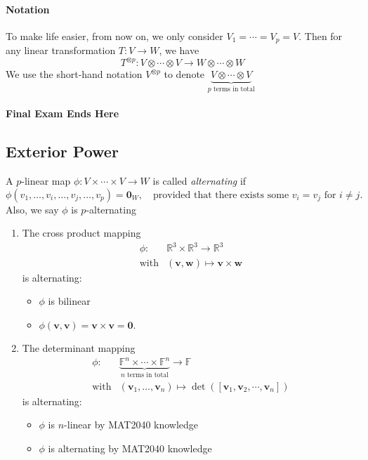 \paragraph{Notation}
To make life easier, from now on, we only consider $V_1=\cdots=V_p=V$.
Then for any linear transformation $T:V\to W$, we have
\[
T^{\otimes p}:V\otimes\cdots\otimes V\to W\otimes\cdots\otimes W
\]
We use the short-hand notation $V^{\otimes p}$ to denote $\underbrace{V\otimes\cdots\otimes V}_{\text{$p$ terms in total}}$

\paragraph{Final Exam Ends Here}

\subsection{Exterior Power}

\begin{definition}
A $p$-linear map $\phi:V\times\cdots\times V\to W$ is called \emph{alternating} if
\[
\phi(v_1,\dots,v_i,\dots,v_j,\dots,v_p)=\bm0_{W},\quad
\text{provided that there exists some $v_i=v_j$ for $i\ne j$}.
\]
Also, we say $\phi$ is $p$-alternating
\end{definition}
\begin{example}
\begin{enumerate}
\item
The cross product mapping
\[
\begin{array}{ll}
\phi:&\mathbb{R}^3\times\mathbb{R}^3\to\mathbb{R}^3\\
\text{with}&(\bm v,\bm w)\mapsto\bm v\times\bm w
\end{array}
\]
is alternating:
\begin{itemize}
\item
$\phi$ is bilinear
\item
$\phi(\bm v,\bm v)=\bm v\times\bm v=\bm0$.
\end{itemize}
\item
The determinant mapping
\[
\begin{array}{ll}
\phi:&\underbrace{\mathbb{F}^n\times\cdots\times\mathbb{F}^n}_{\text{$n$ terms in total}}\to\mathbb{F}\\
\text{with}&(\bm v_1,\dots,\bm v_n)\mapsto\det([\bm v_1,\bm v_2,\cdots,\bm v_n])
\end{array}
\]
is alternating:
\begin{itemize}
\item
$\phi$ is $n$-linear by MAT2040 knowledge
\item
$\phi$ is alternating by MAT2040 knowledge
\end{itemize}
\end{enumerate}
\end{example}

